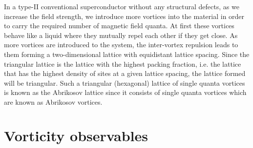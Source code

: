 In a type-II conventional superconductor without any structural defects, as we increase the field strength, we introduce more vortices into the material
in order to carry the required number of magnetic field quanta. At first these vortices behave like a liquid where they mutually repel each other if they 
get close. As more vortices are introduced to the system, the inter-vortex repulsion leads to them forming a two-dimensional lattice with equidistant lattice spacing.
Since the triangular lattice is the lattice with the highest packing fraction, i.e. the lattice that has the highest density of sites at a given lattice spacing,
the lattice formed will be triangular. Such a triangular (hexagonal) lattice of single quanta vortices is known as the Abrikosov lattice since it consists
of single quanta vortices which are known as Abrikosov vortices.

\section{Vorticity observables}
\label{sec:Vor:Obs}


